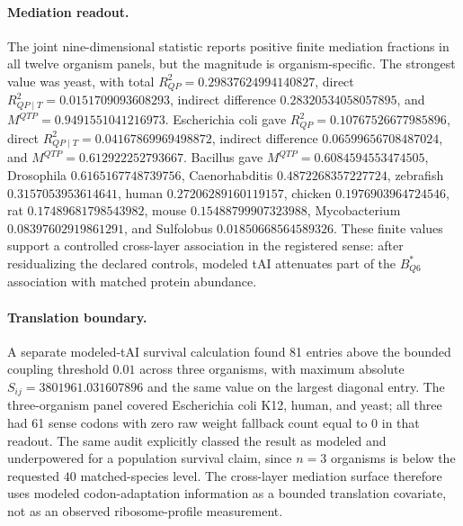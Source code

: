 \paragraph{Mediation readout.}
The joint nine-dimensional statistic reports positive finite mediation fractions in all twelve organism panels, but the magnitude is organism-specific. The strongest value was yeast, with total $R^2_{QP}=0.29837624994140827$, direct $R^2_{QP\mid T}=0.0151709093608293$, indirect difference $0.28320534058057895$, and $M^{QTP}=0.9491551041216973$. Escherichia coli gave $R^2_{QP}=0.10767526677985896$, direct $R^2_{QP\mid T}=0.04167869969498872$, indirect difference $0.06599656708487024$, and $M^{QTP}=0.612922252793667$. Bacillus gave $M^{QTP}=0.6084594553474505$, Drosophila $0.6165167748739756$, Caenorhabditis $0.4872268357227724$, zebrafish $0.3157053953614641$, human $0.27206289160119157$, chicken $0.1976903964724546$, rat $0.17489681798543982$, mouse $0.15488799907323988$, Mycobacterium $0.08397602919861291$, and Sulfolobus $0.01850668564589326$. These finite values support a controlled cross-layer association in the registered sense: after residualizing the declared controls, modeled tAI attenuates part of the $B^*_{Q6}$ association with matched protein abundance.

\paragraph{Translation boundary.}
A separate modeled-tAI survival calculation found 81 entries above the bounded coupling threshold $0.01$ across three organisms, with maximum absolute $S_{ij}=3801961.031607896$ and the same value on the largest diagonal entry. The three-organism panel covered Escherichia coli K12, human, and yeast; all three had 61 sense codons with zero raw weight fallback count equal to 0 in that readout. The same audit explicitly classed the result as modeled and underpowered for a population survival claim, since $n=3$ organisms is below the requested $40$ matched-species level. The cross-layer mediation surface therefore uses modeled codon-adaptation information as a bounded translation covariate, not as an observed ribosome-profile measurement.

